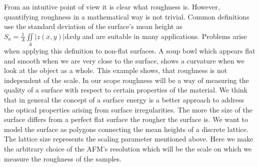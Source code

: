 From an intuitive point of view it is clear what roughness is. However,  
quantifying roughness in a mathematical way is not trivial. Common definitions 
use the standard deviation of the surface's mean height as \mbox{$ S_a = 
\frac{1}{A} \iint\limits_{A}  \vert z \left( x,y \right)  \vert \mathrm dx 
\mathrm dy $} and are suitable in many applications. Problems arise when 
applying this definition to non-flat surfaces. A soup bowl which appears flat 
and smooth when we are very close to the surface, shows a curvature when we look 
at the object as a whole. This example shows, that roughness is not independent 
of the scale. In our scope roughness will be a way of measuring the quality of a 
surface with respect to certain properties of the material.
We think that in general the concept of a surface energy is a better approach to 
address the optical properties arising from surface irregularities. The more the 
size of the surface differs from a perfect flat surface the rougher the surface 
is. We want to model the surface as polygons connecting the mean heights of a 
discrete lattice.  The lattice size represents the scaling parameter mentioned 
above. Here we make the arbitrary choice of the AFM's resolution which will be 
the scale on which we measure the roughness of the samples.


%


